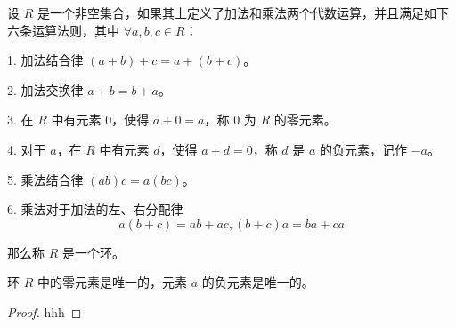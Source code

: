 \begin{definition}
    设 $R$ 是一个非空集合，如果其上定义了加法和乘法两个代数运算，并且满足如下六条运算法则，其中 $\forall a,b,c\in R$：

    1. 加法结合律 $(a+b)+c = a+(b+c)$。

    2. 加法交换律 $a+b = b+a$。

    3. 在 $R$ 中有元素 $0$，使得 $a+0=a$，称 $0$ 为 $R$ 的零元素。

    4. 对于 $a$，在 $R$ 中有元素 $d$，使得 $a+d=0$，称 $d$ 是 $a$ 的负元素，记作 $-a$。

    5. 乘法结合律 $(ab)c = a(bc)$。

    6. 乘法对于加法的左、右分配律
    $$a(b+c) = ab+ac,(b+c)a = ba+ca$$

    那么称 $R$ 是一个环。
\end{definition}

\begin{theorem}
    环 $R$ 中的零元素是唯一的，元素 $a$ 的负元素是唯一的。
\end{theorem}
\begin{proof}
    hhh 
\end{proof}